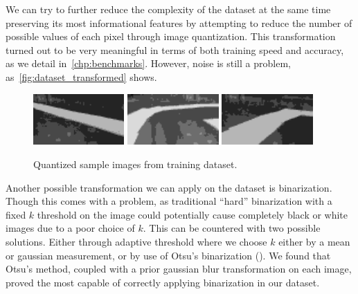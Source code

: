 We can try to further reduce the complexity of the dataset at the same time preserving its most
informational features by attempting to reduce the number of possible values of each pixel through
image quantization. This transformation turned out to be very meaningful in terms of both training
speed and accuracy, as we detail in~\autoref{chp:benchmarks}. However, noise is still a problem,
as~\autoref{fig:dataset_transformed} shows.

\begin{figure}[h]
  \centering\includegraphics[width=0.31\textwidth]{imgs/trans_left.png}
  \includegraphics[width=0.31\textwidth]{imgs/trans_up.png}
  \includegraphics[width=0.31\textwidth]{imgs/trans_right.png}
  \caption{Quantized sample images from training dataset.\label{fig:dataset_transformed}}
\end{figure}

Another possible transformation we can apply on the dataset is binarization. Though this comes with
a problem, as traditional ``hard'' binarization with a fixed $k$ threshold on the image could
potentially cause completely black or white images due to a poor choice of $k$. This can be
countered with two possible solutions.  Either through adaptive threshold where we choose $k$
either by a mean or gaussian measurement, or by use of Otsu's binarization (\cite{otsu}).  We found
that Otsu's method, coupled with a prior gaussian blur transformation on each image, proved the
most capable of correctly applying binarization in our dataset.

